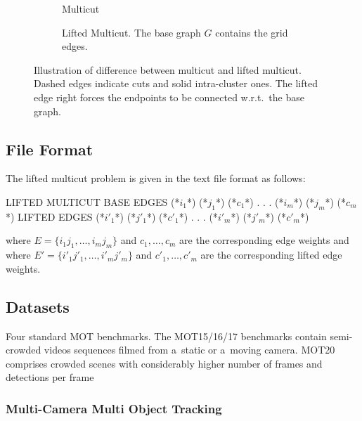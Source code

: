 \begin{figure}[H]
    \begin{subfigure}{0.49\columnwidth}
    \begin{center}
        
    \end{center}
        \caption{Multicut}
    \end{subfigure}
    \hfill
    \begin{subfigure}{0.49\columnwidth}
    \begin{center}
        
    \end{center}
        \caption{Lifted Multicut. The base graph $G$ contains the grid edges.}
    \end{subfigure}
        \caption{
            Illustration of difference between multicut and lifted multicut.
            Dashed edges indicate cuts and solid intra-cluster ones.
            The lifted edge right forces the endpoints to be connected w.r.t.\ the base graph.
        }
        \label{fig:lifted-multicut}
\end{figure}
    
\subsection{File Format}
The lifted multicut problem is given in the text file format as follows:

\begin{fileformat}
LIFTED MULTICUT
BASE EDGES
(*$i_1$*) (*$j_1$*) (*$c_1$*)
.
.
.
(*$i_m$*) (*$j_m$*) (*$c_m$*)
LIFTED EDGES
(*$i'_1$*) (*$j'_1$*) (*$c'_1$*)
.
.
.
(*$i'_m$*) (*$j'_m$*) (*$c'_m$*) 
\end{fileformat}
where $E = \{i_1 j_1, \ldots, i_m j_m\}$ and $c_1,\ldots,c_m$ are the corresponding edge weights and
where $E' = \{i'_1 j'_1, \ldots, i'_m j'_m\}$ and $c'_1,\ldots,c'_m$ are the corresponding lifted edge weights.

\subsection{Datasets}
Four standard MOT benchmarks.
The MOT15/16/17 benchmarks \cite{MOTChallenge2015,MOT16} contain semi-crowded videos sequences filmed from a~static or a~moving camera. 
MOT20 \cite{MOTChallenge20} comprises crowded scenes with considerably higher number of  frames  and detections per frame

\subsubsection{Multi-Camera Multi Object Tracking}
